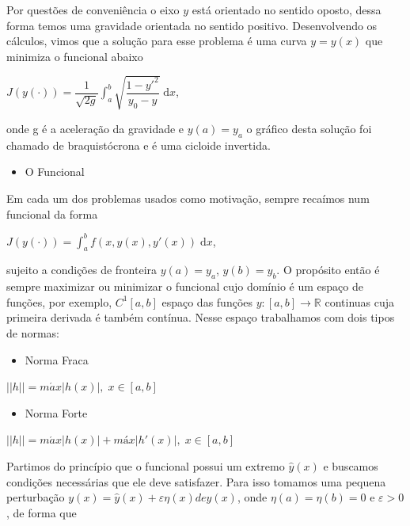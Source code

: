 \documentclass[12pt, a4paper]{article}
\begin{document}
Por questões de conveniência o eixo $y$ está orientado no sentido oposto, dessa forma temos uma gravidade orientada no sentido positivo. Desenvolvendo os cálculos, vimos que a solução para esse problema é uma curva $y=y(x)$ que minimiza o funcional abaixo

\begin{center}
$J(y(\cdot)) = \dfrac{1}{\sqrt{2g}} \int_a^b \sqrt{\dfrac{1-y'^2}{y_0 - y}}\; \mathrm{d}x$,
\end{center}

onde g é a aceleração da gravidade e $y(a) = y_a$  o gráfico desta solução foi chamado de braquistócrona e é uma cicloide invertida.

\begin{itemize}
\item O Funcional
\end{itemize}

Em cada um dos problemas usados como motivação, sempre recaímos num funcional da forma

\begin{center}
$J(y(\cdot)) = \int_a^b f(x, y(x), y'(x)) \; \mathrm{d}x$,
\end{center}

sujeito a condições de fronteira $y(a) = y_a$, $y(b) = y_b$.
O propósito então é sempre maximizar ou minimizar o funcional cujo domínio é um espaço de funções, por exemplo, $C^1[a,b]$ espaço das funções $y:[a,b] \to \mathbb{R}$ continuas cuja primeira derivada é também contínua. Nesse espaço trabalhamos com dois tipos de normas:

\begin{itemize}
\item Norma Fraca
\end{itemize}

\begin{center}
$ ||h|| = m\acute{a}x|h(x)|, \; x \in [a,b] $
\end{center}

\begin{itemize}
\item Norma Forte
\end{itemize}

\begin{center}
$ ||h|| = m\acute{a}x|h(x)| + máx|h'(x)|, \;x \in [a,b] $
\end{center}

Partimos do princípio que o funcional possui um extremo $\hat{y}(x)$ e buscamos condições necessárias que ele deve satisfazer. Para isso tomamos uma pequena perturbação 
$y(x)= \hat{y}(x)+ \varepsilon\eta(x) de \hat{y}(x)$, onde $\eta(a)= \eta(b)=0$ e $\varepsilon>0$, de forma que 
\end{document}
